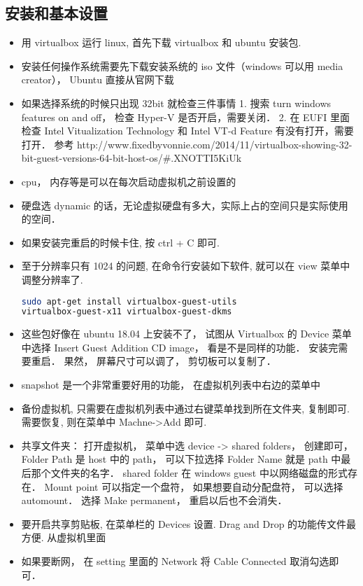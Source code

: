 
\begin{issues}
\issueDraft
\end{issues}

\subsection{安装和基本设置}

\begin{itemize}
\item 用 virtualbox 运行 linux, 首先下载 virtualbox 和 ubuntu 安装包.
\item 安装任何操作系统需要先下载安装系统的 iso 文件（windows 可以用 media creator）， Ubuntu 直接从官网下载
\item 如果选择系统的时候只出现 32bit 就检查三件事情 1. 搜索 turn windows features on and off， 检查 Hyper-V 是否开启，需要关闭． 2. 在 EUFI 里面检查 Intel Vitualization Technology 和 Intel VT-d Feature 有没有打开，需要打开． 参考 http://www.fixedbyvonnie.com/2014/11/virtualbox-showing-32-bit-guest-versions-64-bit-host-os/#.XNOTTI5KiUk
\item cpu， 内存等是可以在每次启动虚拟机之前设置的
\item 硬盘选 dynamic 的话，无论虚拟硬盘有多大，实际上占的空间只是实际使用的空间．
\item 如果安装完重启的时候卡住, 按 ctrl + C 即可.
\item 至于分辨率只有 1024 的问题, 在命令行安装如下软件, 就可以在 view 菜单中调整分辨率了.
\begin{lstlisting}[language=bash]
sudo apt-get install virtualbox-guest-utils
virtualbox-guest-x11 virtualbox-guest-dkms
\end{lstlisting}
\item 这些包好像在 ubuntu 18.04 上安装不了， 试图从 Virtualbox 的 Device 菜单中选择 Insert Guest Addition CD image， 看是不是同样的功能． 安装完需要重启． 果然， 屏幕尺寸可以调了， 剪切板可以复制了．
\item snapshot 是一个非常重要好用的功能， 在虚拟机列表中右边的菜单中
\item 备份虚拟机, 只需要在虚拟机列表中通过右键菜单找到所在文件夹, 复制即可. 需要恢复, 则在菜单中 Machne->Add 即可.
\item 共享文件夹： 打开虚拟机， 菜单中选 device -> shared folders， 创建即可， Folder Path 是 host 中的 path， 可以下拉选择 Folder Name 就是 path 中最后那个文件夹的名字． shared folder 在 windows guest 中以网络磁盘的形式存在． Mount point 可以指定一个盘符， 如果想要自动分配盘符， 可以选择 automount． 选择 Make permanent， 重启以后也不会消失．
\item 要开启共享剪贴板, 在菜单栏的 Devices 设置. Drag and Drop 的功能传文件最方便. 从虚拟机里面
\item 如果要断网， 在 setting 里面的 Network 将 Cable Connected 取消勾选即可．
\end{itemize}

